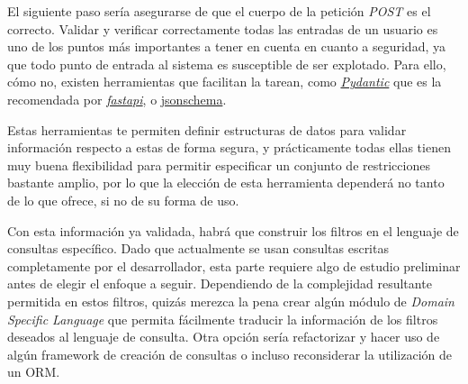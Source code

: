 El siguiente paso sería asegurarse de que el cuerpo de la petición \textit{POST} es el correcto. Validar y verificar correctamente todas las entradas de un usuario es uno de los puntos más importantes a tener en cuenta en cuanto a seguridad, ya que todo punto de entrada al sistema es susceptible de ser explotado. Para ello, cómo no, existen herramientas que facilitan la tarean, como \href{https://docs.pydantic.dev/latest/}{\textit{Pydantic}} que es la recomendada por \href{https://fastapi.tiangolo.com/tutorial/body/}{\textit{fastapi}}, o \href{https://python-jsonschema.readthedocs.io/en/stable/}{jsonschema}. 

Estas herramientas te permiten definir estructuras de datos para validar información respecto a estas de forma segura, y prácticamente todas ellas tienen muy buena flexibilidad para permitir especificar un conjunto de restricciones bastante amplio, por lo que la elección de esta herramienta dependerá no tanto de lo que ofrece, si no de su forma de uso.

Con esta información ya validada, habrá que construir los filtros en el lenguaje de consultas específico. Dado que actualmente se usan consultas escritas completamente por el desarrollador, esta parte requiere algo de estudio preliminar antes de elegir el enfoque a seguir. Dependiendo de la complejidad resultante permitida en estos filtros, quizás merezca la pena crear algún módulo de \textit{Domain Specific Language} que permita fácilmente traducir la información de los filtros deseados al lenguaje de consulta. Otra opción sería refactorizar y hacer uso de algún framework de creación de consultas o incluso reconsiderar la utilización de un ORM.

